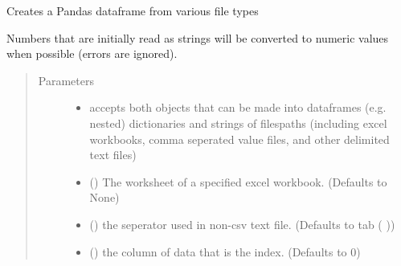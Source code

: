 \documentclass[a4paper,10pt,english]{sphinxmanual}
\begin{document}

\begin{fulllineitems}
\label{\detokenize{io_functions:io_functions.make_df}}
Creates a Pandas dataframe from various file types

Numbers that are initially read as strings will be converted to
numeric values when possible (errors are ignored).
\begin{quote}\begin{description}
\item[{Parameters}] \leavevmode\begin{itemize}
\item {} 
 \textendash{} accepts both objects that can be made into dataframes
(e.g. nested) dictionaries and strings of filespaths (including
excel workbooks, comma seperated value files, and other delimited
text files)

\item {} 
 (\sphinxstyleliteralemphasis{\sphinxupquote{, }}) \textendash{} The worksheet of a specified excel workbook.
(Defaults to None)

\item {} 
 () \textendash{} the seperator used in non-csv text file.
(Defaults to tab (  ))

\item {} 
 () \textendash{} the column of data that is the index.
(Defaults to 0)


\end{itemize}
\end{description}
\end{quote}
\end{fulllineitems}
\end{document}
